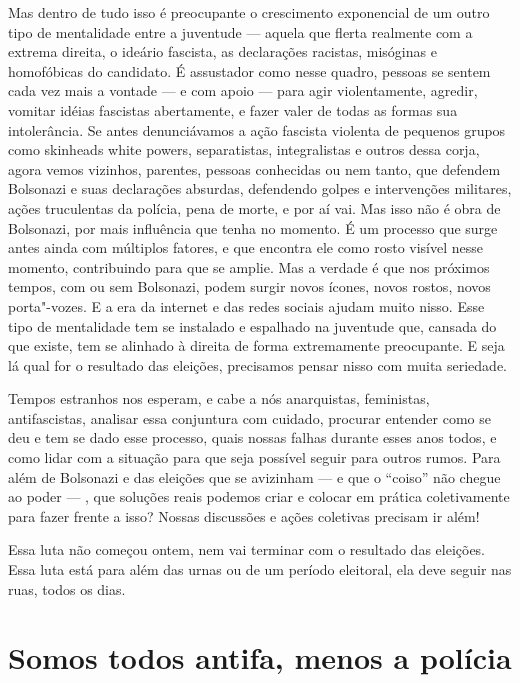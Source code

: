 Mas dentro de tudo isso é preocupante o crescimento exponencial de um outro tipo de mentalidade entre a juventude --- aquela que flerta realmente com a extrema direita, o ideário fascista, as declarações racistas, misóginas e homofóbicas do candidato. É assustador como nesse quadro, pessoas se sentem cada vez mais a vontade --- e com apoio --- para agir violentamente, agredir, vomitar idéias fascistas abertamente, e fazer valer de todas as formas sua intolerância. Se antes denunciávamos a ação fascista violenta de pequenos grupos como skinheads white powers, separatistas, integralistas e outros dessa corja, agora vemos vizinhos, parentes, pessoas conhecidas ou nem tanto, que defendem Bolsonazi e suas declarações absurdas, defendendo golpes e intervenções militares, ações truculentas da polícia, pena de morte, e por aí vai. Mas isso não é obra de Bolsonazi, por mais influência que tenha no momento. É um processo que surge antes ainda com múltiplos fatores, e que encontra ele como rosto visível nesse momento, contribuindo para que se amplie. Mas a verdade é que nos próximos tempos, com ou sem Bolsonazi, podem surgir novos ícones, novos rostos, novos porta"-vozes. E a era da internet e das redes sociais ajudam muito nisso. Esse tipo de mentalidade tem se instalado e espalhado na juventude que, cansada do que existe, tem se alinhado à direita de forma extremamente preocupante. E seja lá qual for o resultado das eleições, precisamos pensar nisso com muita seriedade.

Tempos estranhos nos esperam, e cabe a nós anarquistas, feministas, antifascistas, analisar essa conjuntura com cuidado, procurar entender como se deu e tem se dado esse processo, quais nossas falhas durante esses anos todos, e como lidar com a situação para que seja possível seguir para outros rumos. Para além de Bolsonazi e das eleições que se avizinham --- e que o ``coiso'' não chegue ao poder --- , que soluções reais podemos criar e colocar em prática coletivamente para fazer frente a isso? Nossas discussões e ações coletivas precisam ir além!

Essa luta não começou ontem, nem vai terminar com o resultado das eleições. Essa luta está para além das urnas ou de um período eleitoral, ela deve seguir nas ruas, todos os dias.

\chapter*{Somos todos antifa, menos a polícia}

